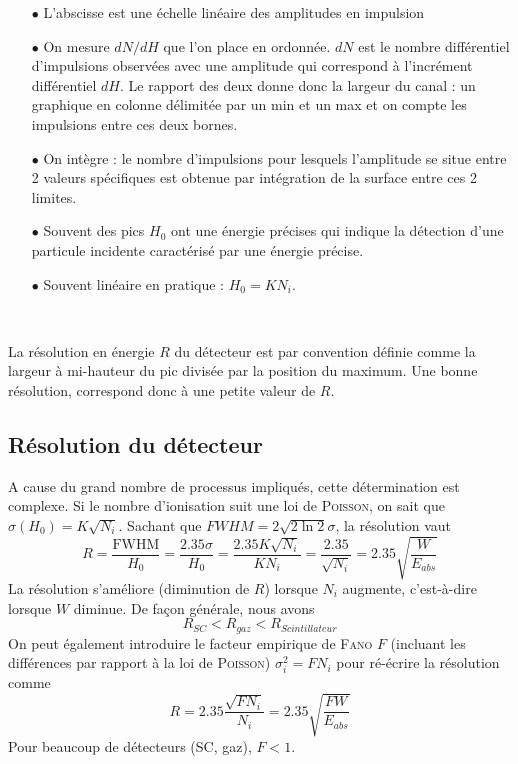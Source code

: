  
\begin{itemize}
\item[$\bullet$] L'abscisse est une échelle linéaire des amplitudes
en impulsion
\item[$\bullet$] On mesure $dN/dH$ que l'on place en ordonnée. 
$dN$ est le nombre différentiel d'impulsions observées avec une
amplitude qui correspond à l'incrément différentiel $dH$. Le 
rapport des deux donne donc la largeur du canal : un graphique en 
colonne délimitée par un min et un max et on compte les 
impulsions entre ces deux bornes. 
\item[$\bullet$] On intègre : le nombre d'impulsions pour lesquels
l'amplitude se situe entre 2 valeurs spécifiques est obtenue par
intégration de la surface entre ces 2 limites.
\item[$\bullet$] Souvent des pics $H_0$ ont une énergie précises 
qui indique la détection d'une particule incidente caractérisé par
une énergie précise.
\item[$\bullet$] Souvent linéaire en pratique : $H_0 = KN_i$.
\end{itemize}\ 

La résolution en énergie $R$ du détecteur est par convention 
définie comme la largeur à mi-hauteur du pic divisée par la 
position du maximum. Une bonne résolution, correspond donc à une
petite valeur de $R$.

\subsection{Résolution du détecteur}%
A cause du grand nombre de processus impliqués, cette détermination
est complexe. Si le nombre d'ionisation suit une loi de 
\textsc{Poisson}, on sait que $\sigma(H_0)=K\sqrt{N_i}$. Sachant
que $FWHM = 2\sqrt{2\ln 2}\sigma$, la résolution vaut
\begin{equation}
R=\frac{\mbox{FWHM}}{H_0}=\frac{2.35\sigma}{H_0}=\frac{2.35K\sqrt{N_i}}{KN_i}=\frac{2.35}{\sqrt{N_i}}=2.35\sqrt{\frac{W}{E_{abs}}}
\end{equation}
La résolution s'améliore (diminution de $R$) lorsque $N_i$ 
augmente, c'est-à-dire lorsque $W$ diminue. De façon générale, 
nous avons
\begin{equation}
R_{SC} < R_{gaz} < R_{Scintillateur}
\end{equation}
On peut également introduire le facteur empirique de \textsc{Fano}
$F$  (incluant les différences par rapport à la loi de 
\textsc{Poisson}) $\sigma_i^2 = FN_i$ pour ré-écrire la 
résolution comme
\begin{equation}
R=2.35\frac{\sqrt{FN_i}}{N_i}=2.35\sqrt{\frac{FW}{E_{abs}}}
\end{equation}
Pour beaucoup de détecteurs (SC, gaz), $F<1$.


